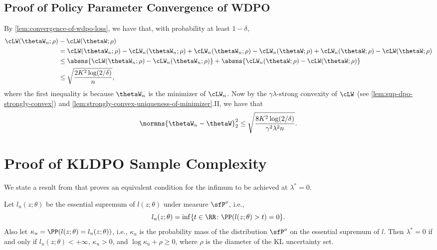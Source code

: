 \subsection{Proof of Policy Parameter Convergence of WDPO}\label{sec:proof-of-robust-policy-param-converg}
By \cref{lem:convergence-of-wdpo-loss}, we have that, with probability at least $1-\delta$,
    \begin{align*}
        \cLW(\thetaW_n;\rho) &-\cLW(\thetaW;\rho) \\
        &= \cLW(\thetaW_n;\rho)-\cLW_n(\thetaW_n;\rho)+\cLW_n(\thetaW_n;\rho)-\cLW_n(\thetaW;\rho) +\cLW_n(\thetaW;\rho)-\cLW(\thetaW;\rho)\\
        &\leq \absns{\cLW(\thetaW_n;\rho)-\cLW_n(\thetaW_n;\rho)} + \absns{\cLW_n(\thetaW;\rho)-\cLW(\thetaW;\rho)} \\
        &\leq \sqrt{\frac{2K^2\log(2/\delta)}{n}},
    \end{align*}
    where the first inequality is because $\thetaW_n$ is the minimizer of $\cLW_n$. Now by the $\gamma\lambda$-strong convexity of $\cLW$ (see \cref{lem:sup-dpo-strongly-convex}) and \cref{lem:strongly-convex-uniqueness-of-minimizer}.II, we have that
    \begin{equation*}
        \normns{\thetaW_n -\thetaW}_2^2 \leq \sqrt{\frac{8K^2\log(2/\delta)}{\gamma^2\lambda^2 n}}.
    \end{equation*}

   

\section{Proof of KLDPO Sample Complexity}\label{sec:kldpo-proof-appendix}

We state a result from \citet{hu2013kullback} that proves an equivalent condition for the infimum to be achieved at $\lambda^*=0$.
\begin{proposition}\label{prop:lambda-zero-equiv}
    Let $l_u(z;\theta)$ be the essential supremum of $l(z;\theta)$ under measure $\sfP^o$, i.e.,
    \begin{equation*}
        l_u(z;\theta) = \inf\{ t \in\RR\colon\PP(l(z;\theta)>t)=0\}.
    \end{equation*}
    Also let $\kappa_u=\PP(l(z;\theta)=l_u(z;\theta))$, i.e., $\kappa_u$ is the probability mass of the distribution $\sfP^o$ on the essential supremum of $l$. Then $\lambda^*=0$ if and only if $l_u(z;\theta)<+\infty$, $\kappa_u>0$, and $\log\kappa_u+\rho \geq 0$, where $\rho$ is the diameter of the KL uncertainty set.
\end{proposition}

